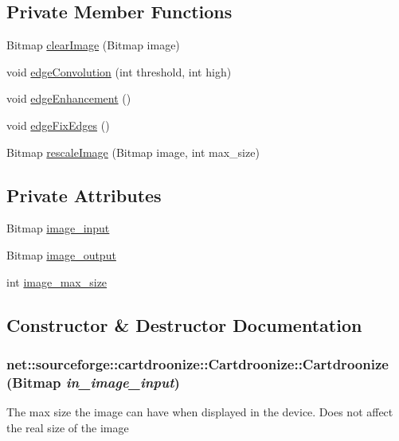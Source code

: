 \subsection*{Private Member Functions}
\begin{DoxyCompactItemize}
\item 
Bitmap \hyperlink{classnet_1_1sourceforge_1_1cartdroonize_1_1Cartdroonize_a25e2dc7b8de4289b58de1a93dc4b6baf}{clearImage} (Bitmap image)
\item 
void \hyperlink{classnet_1_1sourceforge_1_1cartdroonize_1_1Cartdroonize_ae477df2b914a566630a950ded06a6d0e}{edgeConvolution} (int threshold, int high)
\item 
void \hyperlink{classnet_1_1sourceforge_1_1cartdroonize_1_1Cartdroonize_aa96080dadc14446e14fa2ad87e3c6517}{edgeEnhancement} ()
\item 
void \hyperlink{classnet_1_1sourceforge_1_1cartdroonize_1_1Cartdroonize_ad69a655473d02551eebb461899470d5d}{edgeFixEdges} ()
\item 
Bitmap \hyperlink{classnet_1_1sourceforge_1_1cartdroonize_1_1Cartdroonize_ae9ef33e35b95674d616d2a1e7bc527f2}{rescaleImage} (Bitmap image, int max\_\-size)
\end{DoxyCompactItemize}
\subsection*{Private Attributes}
\begin{DoxyCompactItemize}
\item 
Bitmap \hyperlink{classnet_1_1sourceforge_1_1cartdroonize_1_1Cartdroonize_ae5315d354649c37ff7a683f3e1316263}{image\_\-input}
\item 
Bitmap \hyperlink{classnet_1_1sourceforge_1_1cartdroonize_1_1Cartdroonize_a60dad11dc13c083b5b092c2289a082af}{image\_\-output}
\item 
int \hyperlink{classnet_1_1sourceforge_1_1cartdroonize_1_1Cartdroonize_af10d9828c5247f7f12f453c1f7903799}{image\_\-max\_\-size}
\end{DoxyCompactItemize}


\subsection{Constructor \& Destructor Documentation}
\hypertarget{classnet_1_1sourceforge_1_1cartdroonize_1_1Cartdroonize_ac239b9f8ae651dcf5d7758d481a6866c}{
\subsubsection[{Cartdroonize}]{\setlength{\rightskip}{0pt plus 5cm}net::sourceforge::cartdroonize::Cartdroonize::Cartdroonize (Bitmap {\em in\_\-image\_\-input})}}
\label{classnet_1_1sourceforge_1_1cartdroonize_1_1Cartdroonize_ac239b9f8ae651dcf5d7758d481a6866c}
The max size the image can have when displayed in the device. Does not affect the real size of the image 

